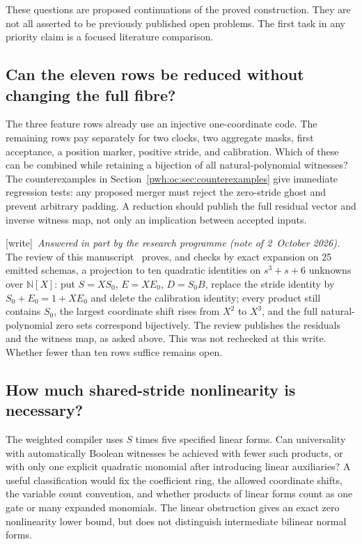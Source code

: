 \documentclass[11pt,letterpaper]{article}
\numberwithin{equation}{section}
\theoremstyle{definition}
\newcommand{\N}{\mathbb N}
\newcommand{\wtag}{\textup{[write]}}
\begin{document}
These questions are proposed continuations of the proved construction.
They are not all asserted to be previously published open problems.
The first task in any priority claim is a focused literature comparison.

\subsection{Can the eleven rows be reduced without changing the full fibre?}\label{pwh:oc:q:rows}

The three feature rows already use an injective one-coordinate code.
The remaining rows pay separately for two clocks, two aggregate masks,
first acceptance, a position marker, positive stride, and calibration.
Which of these can be combined while retaining a bijection of all
natural-polynomial witnesses? The counterexamples in
Section~\ref{pwh:oc:sec:counterexamples} give immediate regression tests:
any proposed merger must reject the zero-stride ghost and prevent
arbitrary padding. A reduction should publish the full residual vector
and inverse witness map, not only an implication between accepted inputs.

\wtag\ \emph{Answered in part by the research programme (note of
2~October 2026).} The review of this manuscript~\cite{reviewOC} proves, and
checks by exact expansion on 25 emitted schemas, a projection to ten
quadratic identities on $s^3+s+6$ unknowns over $\N[X]$: put $S=XS_0$,
$E=XE_0$, $D=S_0B$, replace the stride identity by $S_0+E_0=1+XE_0$ and
delete the calibration identity; every product still contains $S_0$, the
largest coordinate shift rises from $X^2$ to $X^3$, and the full
natural-polynomial zero sets correspond bijectively. The review publishes
the residuals and the witness map, as asked above. This was not rechecked at
this write. Whether fewer than ten rows suffice remains open.

\subsection{How much shared-stride nonlinearity is necessary?}

The weighted compiler uses $S$ times five specified linear forms.
Can universality with automatically Boolean witnesses be achieved with
fewer such products, or with only one explicit quadratic monomial after
introducing linear auxiliaries? A useful classification would fix the
coefficient ring, the allowed coordinate shifts, the variable count
convention, and whether products of linear forms count as one gate or
many expanded monomials. The linear obstruction gives an exact zero
nonlinearity lower bound, but does not distinguish intermediate bilinear
normal forms.
\end{document}
